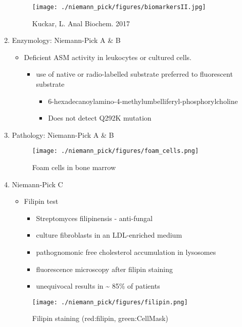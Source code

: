 \documentclass{scrartcl}
\begin{document}
\begin{enumerate}
\begin{figure}[htbp]
\centering
\texttt{[image: ./niemann\_pick/figures/biomarkersII.jpg]}
\caption{\label{fig:orgf6571b1}
Kuckar, L. Anal Biochem. 2017}
\end{figure}

\item Enzymology: Niemann-Pick A \& B
\label{sec:orgdc7ef32}

\begin{itemize}
\item Deficient ASM activity in leukocytes or cultured cells.
\begin{itemize}
\item use of native or radio-labelled substrate preferred to fluorescent substrate
\begin{itemize}
\item 6-hexadecanoylamino-4-methylumbelliferyl-phosphorylcholine
\item Does not detect Q292K mutation
\end{itemize}
\end{itemize}
\end{itemize}

\item Pathology: Niemann-Pick A \& B
\label{sec:org59ebd0f}

\begin{figure}[htbp]
\centering
\texttt{[image: ./niemann\_pick/figures/foam\_cells.png]}
\caption{\label{fig:org200d0b7}
Foam cells in bone marrow}
\end{figure}

\item Niemann-Pick C
\label{sec:org595c67e}
\begin{itemize}
\item Filipin test
\begin{itemize}
\item Streptomyces filipinensis - anti-fungal
\item culture fibroblasts in an LDL-enriched medium
\item pathognomonic free cholesterol accumulation in lysosomes
\item fluorescence microscopy after filipin staining
\item unequivocal results in \textasciitilde{} 85\% of patients
\end{itemize}
\end{itemize}

\begin{figure}[htbp]
\centering
\texttt{[image: ./niemann\_pick/figures/filipin.png]}
\caption{\label{fig:org3f483cb}
Filipin staining (red:filipin, green:CellMask)}
\end{figure}
\end{enumerate}
\end{document}
